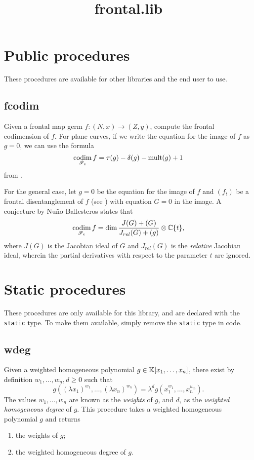 \documentclass{article}
\title{frontal.lib}
\DeclareMathOperator{\codim}{codim}
\DeclareMathOperator{\mult}{mult}
\begin{document}
\maketitle

\section{Public procedures}
These procedures are available for other libraries and the end user to use.

\subsection{fcodim}
Given a frontal map germ $f\colon (N,x) \to (Z,y)$, compute the frontal codimension of $f$.
For plane curves, if we write the equation for the image of $f$ as $g=0$, we can use the formula
	\[\codim_{\ms{F}_e}f=\tau(g)-\delta(g)-\mult(g)+1\]
from \cite{MNODeformations}.

For the general case, let $g=0$ be the equation for the image of $f$ and $(f_t)$ be a frontal disentanglement of $f$ (see \cite{MNOSurfaces}) with equation $G=0$ in the image.
A conjecture by Nuño-Ballesteros states that
	\[\codim_{\ms{F}_e}f=\dim \frac{J(G)+(G)}{J_{rel}(G)+(g)}\otimes \mb{C}\{t\},\]
where $J(G)$ is the Jacobian ideal of $G$ and $J_{rel}(G)$ is the \emph{relative} Jacobian ideal, wherein the partial derivatives with respect to the parameter $t$ are ignored.

\section{Static procedures}
These procedures are only available for this library, and are declared with the \verb!static! type.
To make them available, simply remove the \verb!static! type in code.

\subsection{wdeg}
Given a weighted homogeneous polynomial $g \in \mathbb{K}[x_1,\dots,x_n]$, there exist by definition $w_1,\dots,w_n, d \geq 0$ such that
	\[g((\lambda x_1)^{w_1},\dots,(\lambda x_n)^{w_n})=\lambda^dg(x_1^{w_1},\dots,x_n^{w_n}).\]
The values $w_1,\dots,w_n$ are known as the \emph{weights} of $g$, and $d$, as the \emph{weighted homogeneous degree} of $g$.
This procedure takes a weighted homogeneous polynomial $g$ and returns
\begin{enumerate}
	\item the weights of $g$;
	\item the weighted homogeneous degree of $g$.
\end{enumerate}



\end{document}
